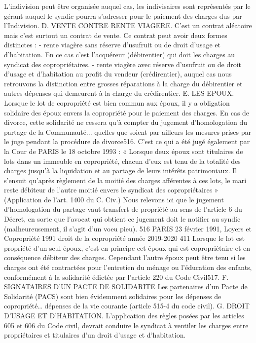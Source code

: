 L'indivision peut être organisée auquel cas, les indivisaires sont représentés par le gérant auquel le syndic pourra s'adresser pour le paiement des charges dus par l'Indivision.
D. VENTE CONTRE RENTE VIAGERE.
C'est un contrat aléatoire mais c'est surtout un contrat de vente.
Ce contrat peut avoir deux formes distinctes :
- rente viagère sans réserve d'usufruit ou de droit d'usage et d'habitation. En ce cas c'est l'acquéreur (débirentier) qui doit les charges au syndicat des copropriétaires.
- rente viagère avec réserve d'usufruit ou de droit d'usage et d'habitation au profit du vendeur (crédirentier), auquel cas nous retrouvons la distinction entre grosses réparations à la charge du débirentier et autres dépenses qui demeurent à la charge du crédirentier.
E. LES EPOUX.
Lorsque le lot de copropriété est bien commun aux époux, il y a obligation solidaire des époux envers la copropriété pour le paiement des charges. En cas de divorce, cette solidarité ne cessera qu'à compter du jugement d'homologation du partage de la Communauté... quelles que soient par ailleurs les mesures prises par le juge pendant la procédure de divorce516.
C'est ce qui a été jugé également par la Cour de PARIS le 18 octobre 1993 :
« Lorsque deux époux sont titulaires de lots dans un immeuble en copropriété, chacun d'eux est tenu de la totalité des charges jusqu'à la liquidation et au partage de leurs intérêts patrimoniaux. Il s'ensuit qu'après règlement de la moitié des charges afférentes à ces lots, le mari reste débiteur de l'autre moitié envers le syndicat des copropriétaires » (Application de l'art. 1400 du C. Civ.)
Nous relevons ici que le jugement d’homologation du partage vaut transfert de propriété au sens de l’article 6 du Décret, en sorte que l’avocat qui obtient ce jugement doit le notifier au syndic (malheureusement, il s’agit d’un voeu pieu).
516 PARIS 23 février 1991, Loyers et Copropriété 1991 
droit de la copropriété année 2019-2020
411
Lorsque le lot est propriété d'un seul époux, c'est en principe cet époux qui est copropriétaire et en conséquence débiteur des charges. Cependant l'autre époux peut être tenu si les charges ont été contractées pour l'entretien du ménage ou l'éducation des enfants, conformément à la solidarité édictée par l'article 220 du Code Civil517.
F. SIGNATAIRES D’UN PACTE DE SOLIDARITE
Les partenaires d’un Pacte de Solidarité (PACS) sont bien évidemment solidaires pour les dépenses de copropriété… dépenses de la vie courante (article 515-4 du code civil).
G. DROIT D’USAGE ET D’HABITATION.
L'application des règles posées par les articles 605 et 606 du Code civil, devrait conduire le syndicat à ventiler les charges entre propriétaires et titulaires d'un droit d'usage et d'habitation.
